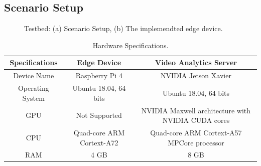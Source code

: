 \subsection{Scenario Setup}
\begin{figure}
 \centering
  \caption{Testbed: (a) Scenario Setup, (b) The implemendted edge device.}
  \label{fig:testbed}
\end{figure}
\begin{table}[]
\centering
\caption{Hardware Specifications.}
\label{tab:hw}
\begin{tabular}{|c|c|c|}
\hline
\textbf{Specifications} & \textbf{Edge Device}   & \textbf{Video Analytics Server}                        \\ \hline
Device Name             & Raspberry Pi 4 & NVIDIA Jetson Xavier                                     \\ \hline
Operating System        & Ubuntu 18.04, 64 bits  & Ubuntu 18.04, 64 bits                                  \\ \hline
GPU                     & Not Supported          & NVIDIA Maxwell architecture with  NVIDIA CUDA cores \\ \hline
CPU                     & Quad-core ARM Cortext-A72          & Quad-core ARM Cortext-A57 MPCore processor             \\ \hline
RAM                     & 4 GB                   & 8 GB                                                   \\ \hline
\end{tabular}
\end{table}
